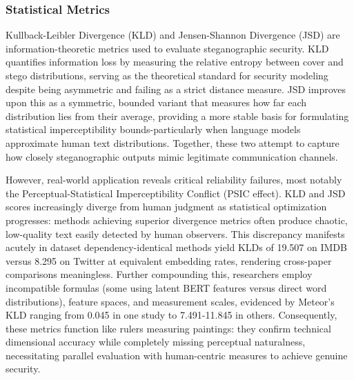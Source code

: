 \subsubsection{Statistical Metrics}
Kullback-Leibler Divergence (KLD) \cite{1320776d-9e76-337e-a755-73010b6e4b64} and Jensen-Shannon Divergence (JSD) are information-theoretic metrics used to evaluate steganographic security. KLD quantifies information loss by measuring the relative entropy between cover and stego distributions, serving as the theoretical standard for security modeling despite being asymmetric and failing as a strict distance measure. JSD improves upon this as a symmetric, bounded variant that measures how far each distribution lies from their average, providing a more stable basis for formulating statistical imperceptibility bounds-particularly when language models approximate human text distributions. Together, these two attempt to capture how closely steganographic outputs mimic legitimate communication channels.

However, real-world application reveals critical reliability failures, most notably the Perceptual-Statistical Imperceptibility Conflict (PSIC effect). KLD and JSD scores increasingly diverge from human judgment as statistical optimization progresses: methods achieving superior divergence metrics often produce chaotic, low-quality text easily detected by human observers. This discrepancy manifests acutely in dataset dependency-identical methods yield KLDs of 19.507 on IMDB versus 8.295 on Twitter at equivalent embedding rates, rendering cross-paper comparisons meaningless. Further compounding this, researchers employ incompatible formulas (some using latent BERT features versus direct word distributions), feature spaces, and measurement scales, evidenced by Meteor's KLD ranging from 0.045 in one study to 7.491-11.845 in others. Consequently, these metrics function like rulers measuring paintings: they confirm technical dimensional accuracy while completely missing perceptual naturalness, necessitating parallel evaluation with human-centric measures to achieve genuine security.







